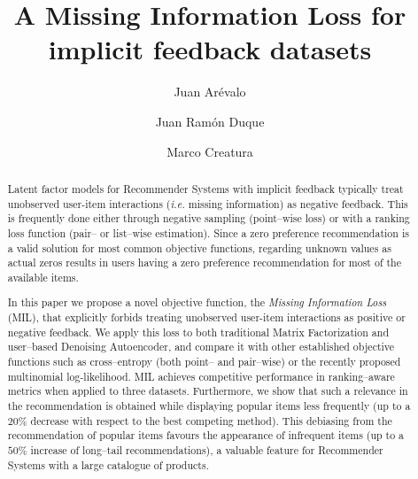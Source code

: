 \documentclass[sigconf]{acmart}
\begin{document}
\title[Missing Information Loss]{A Missing Information Loss for implicit feedback datasets}

\author{Juan Ar\'evalo}

\author{Juan Ram\'on Duque}

\author{Marco Creatura}

\renewcommand{\shortauthors}{Ar\'evalo, Duque and Creatura}

\newcommand{\MFsquare}{\textsc{MF-square}}
\newcommand{\MFmil}{\textsc{MF-mil}}
\newcommand{\MFce}{\textsc{MF-CE}}
\newcommand{\CEpointlinsig}{\textsc{CE$_{\rm Point}$ lin-sig}}
\newcommand{\CEpointsigsig}{\textsc{CE$_{\rm Point}$ sig-sig}}
\newcommand{\CEpairlinsig}{\textsc{CE$_{\rm Pair}$ lin-sig}}
\newcommand{\CEpairsigsig}{\textsc{CE$_{\rm Pair}$ sig-sig}}
\newcommand{\MULTItanhlin}{\textsc{MULTI tanh-lin}}
\newcommand{\MILlinsig}{\textsc{MIL lin-sig}}
\newcommand{\MILsigsig}{\textsc{MIL sig-sig}}


\begin{abstract}
Latent factor models for Recommender Systems with implicit feedback typically treat unobserved user-item interactions (\emph{i.e.} missing information) as negative feedback. This is frequently done 
either through negative sampling (point--wise loss) or with a ranking loss function (pair-- or list--wise estimation). 
Since a zero preference recommendation is a valid solution for most common objective functions, 
regarding unknown values as actual zeros results in users 
having a zero preference recommendation  for most of the available items. 

In this paper we propose a novel objective function, the \emph{Missing Information Loss} (MIL), 
that explicitly forbids treating unobserved user-item interactions as positive or negative feedback. 
We apply this loss to both traditional Matrix Factorization and user--based Denoising Autoencoder, and compare it with other established objective functions such as cross--entropy (both point-- and pair--wise) or the recently proposed multinomial log-likelihood. MIL achieves competitive performance in ranking--aware metrics when applied to three datasets.
Furthermore, we show that such a relevance in the recommendation is obtained while displaying popular items less frequently (up to a $20 \%$ decrease with respect to the best competing method). This debiasing from the recommendation of popular items favours the appearance of infrequent items (up to a $50 \%$ increase of long--tail recommendations), a valuable feature for Recommender Systems with a large catalogue of products. 
\end{abstract}
\end{document}
